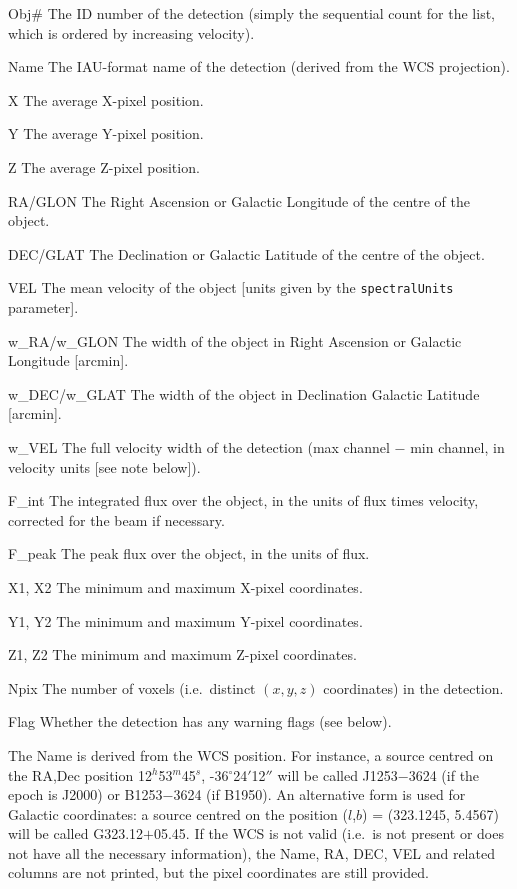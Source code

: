 \documentclass[12pt,a4paper]{article}
\newcommand{\ie}{i.e.\ }
\newcommand{\entrylabel}[1]{\mbox{\textsf{\bf{#1:}}}\hfil}
\newenvironment{entry}
        {\begin{list}{}%
                {\renewcommand{\makelabel}{\entrylabel}%
                        \setlength{\labelwidth}{30mm}%
                        \setlength{\labelsep}{5pt}%
                        \setlength{\itemsep}{2pt}%
                        \setlength{\parsep}{2pt}%
                        \setlength{\leftmargin}{35mm}%
                }%
        }%
{\end{list}}
\begin{document}
\begin{entry}
\item[Obj\#] The ID number of the detection (simply the sequential
  count for the list, which is ordered by increasing velocity).
\item[Name] The IAU-format name of the detection (derived from the WCS
  projection).
\item[X] The average X-pixel position.
\item[Y] The average Y-pixel position.
\item[Z] The average Z-pixel position.
\item[RA/GLON] The Right Ascension or Galactic Longitude of the centre
of the object.
\item[DEC/GLAT] The Declination or Galactic Latitude of the centre of
the object.
\item[VEL] The mean velocity of the object [units given by the
  \texttt{spectralUnits} parameter].
\item[w\_RA/w\_GLON] The width of the object in Right Ascension or
Galactic Longitude [arcmin].
\item[w\_DEC/w\_GLAT] The width of the object in Declination Galactic
  Latitude [arcmin].
\item[w\_VEL] The full velocity width of the detection (max channel
  $-$ min channel, in velocity units [see note below]).
\item[F\_int] The integrated flux over the object, in the units of
  flux times velocity, corrected for the beam if necessary.
\item[F\_peak] The peak flux over the object, in the units of flux.
\item[X1, X2] The minimum and maximum X-pixel coordinates.
\item[Y1, Y2] The minimum and maximum Y-pixel coordinates.
\item[Z1, Z2] The minimum and maximum Z-pixel coordinates.
\item[Npix] The number of voxels (\ie distinct $(x,y,z)$ coordinates)
  in the detection.
\item[Flag] Whether the detection has any warning flags (see below). 
\end{entry}
The Name is derived from the WCS position. For instance, a source
centred on the RA,Dec position 12$^h$53$^m$45$^s$,
-36$^\circ$24$'$12$''$ will be called J1253$-$3624 (if the epoch is
J2000) or B1253$-$3624 (if B1950). An alternative form is used for
Galactic coordinates: a source centred on the position ($l$,$b$) =
(323.1245, 5.4567) will be called G323.12$+$05.45. If the WCS is not
valid (\ie is not present or does not have all the necessary
information), the Name, RA, DEC, VEL and related columns are not
printed, but the pixel coordinates are still provided.
\end{document}
